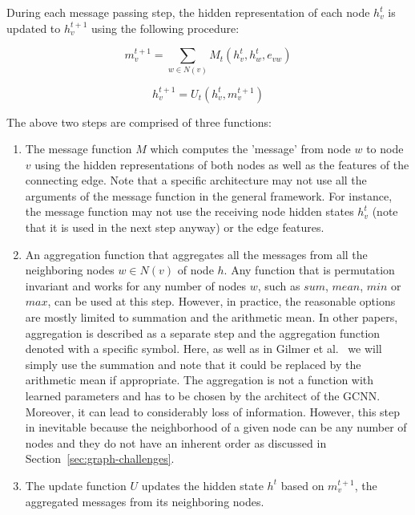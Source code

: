 During each message passing step, the hidden representation of each node $h_v^t$ is updated to $h_v^{t+1}$ using the following procedure:

\begin{equation}
m_v^{t+1} = \sum_{w \in N(v)} M_t(h_v^t, h_w^t, e_{vw})
\end{equation}
\label{eq:message-function}

\begin{equation}
h_v^{t+1} = U_t(h_v^t, m_v^{t+1})
\end{equation}
\label{eq:update-function}

The above two steps are comprised of three functions:

\begin{enumerate}
	\item The message function $M$ which computes the 'message' from node $w$ to node $v$ using the hidden representations of both nodes as well as the features of the connecting edge. Note that a specific architecture may not use all the arguments of the message function in the general framework. For instance, the message function may not use the receiving node hidden states $h_v^t$ (note that it is used in the next step anyway) or the edge features.
	\item An aggregation function that aggregates all the messages from all the neighboring nodes $w \in N(v)$ of node $h$. Any function that is permutation invariant and works for any number of nodes $w$, such as $sum$, $mean$, $min$ or $max$, can be used at this step. However, in practice, the reasonable options are mostly limited to summation and the arithmetic mean.	
	In other papers, aggregation is described as a separate step and the aggregation function denoted with a specific symbol. Here, as well as in Gilmer et al.~\cite{Gilmer2017} we will simply use the summation and note that it could be replaced by the arithmetic mean if appropriate.
	The aggregation is not a function with learned parameters and has to be chosen by the architect of the GCNN. Moreover, it can lead to considerably loss of information. However, this step in inevitable because the neighborhood of a given node can be any number of nodes and they do not have an inherent order as discussed in Section~\ref{sec:graph-challenges}.
	\item The update function $U$ updates the hidden state $h^t$ based on  $m_v^{t+1}$, the aggregated messages from its neighboring nodes.
\end{enumerate}


